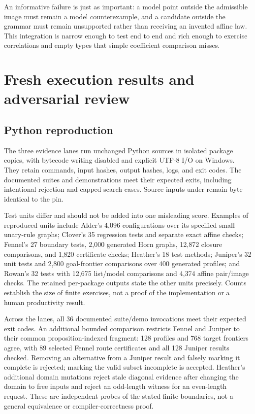 \documentclass[11pt,letterpaper]{article}
\newcommand{\code}[1]{\texttt{\detokenize{#1}}}
\theoremstyle{definition}\newtheorem{definition}[proposition]{Definition}
\theoremstyle{remark}\newtheorem{remark}[proposition]{Remark}
\begin{document}
An informative failure is just as important: a model point outside the
admissible image must remain a model counterexample, and a candidate outside
the grammar must remain unsupported rather than receiving an invented affine
law. This integration is narrow enough to test end to end and rich enough
to exercise correlations and empty types that simple coefficient comparison
misses.

\section{Fresh execution results and adversarial review}
\label{sec:evidence}

\subsection{Python reproduction}

The three evidence lanes run unchanged Python sources in isolated package
copies, with bytecode writing disabled and explicit UTF-8 I/O on Windows.
They retain commands, input hashes, output hashes, logs, and exit codes.
The documented suites and demonstrations meet their expected exits, including
intentional rejection and capped-search cases. Source inputs under
\code{docs/round-4/ideas} remain byte-identical to the pin.

Test units differ and should not be added into one misleading score. Examples
of reproduced units include Alder's 4,096 configurations over its specified
small unary-rule graphs; Clover's 35 regression tests and separate exact
affine checks; Fennel's 27 boundary tests, 2,000 generated Horn graphs,
12,872 closure comparisons, and 1,820 certificate checks; Heather's 18 test
methods; Juniper's 32 unit tests and 2,800 goal-frontier comparisons over
400 generated profiles; and Rowan's 32 tests with 12,675 list/model comparisons
and 4,374 affine pair/image checks. The retained per-package outputs state
the other units precisely. Counts establish the size of finite exercises,
not a proof of the implementation or a human productivity result.

Across the lanes, all 36 documented suite/demo invocations meet their expected
exit codes. An additional bounded comparison restricts Fennel and Juniper to
their common proposition-indexed fragment: 128 profiles and 768 target
frontiers agree, with 89 selected Fennel route certificates and all 128
Juniper results checked. Removing an alternative from a Juniper result and
falsely marking it complete is rejected; marking the valid subset incomplete
is accepted. Heather's additional domain mutations reject stale diagonal
evidence after changing the domain to free inputs and reject an odd-length
witness for an even-length request. These are independent probes of the
stated finite boundaries, not a general equivalence or compiler-correctness proof.
\end{document}
